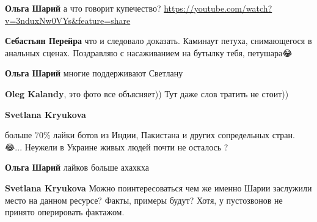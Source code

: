 \begin{itemize}
\begin{itemize}
\textbf{Ольга Шарий} а что говорит купечество? \url{https://youtube.com/watch?v=3nduxNw0VYs&feature=share}

 
\textbf{Себастьян Перейра} что и следовало доказать. Каминаут петуха, снимающегося в анальных сценах. Поздравляю с насаживанием на бутылку тебя, петушара😂

 
\textbf{Ольга Шарий} многие поддерживают Светлану

 
\textbf{Oleg Kalandy}, это фото все объясняет)) Тут даже слов тратить не стоит))

 
\textbf{Svetlana Kryukova} 

больше 70\% лайки ботов из Индии, Пакистана и других сопредельных стран. 😂... Неужели в Украине живых людей почти не осталось ?


 
\textbf{Ольга Шарий} лайков больше ахахкха

 
\textbf{Svetlana Kryukova} Можно поинтересоваться чем же именно Шарии заслужили место на данном ресурсе? Факты, примеры будут? Хотя, у пустозвонов не принято оперировать фактажом.


\end{itemize}
\end{itemize}
